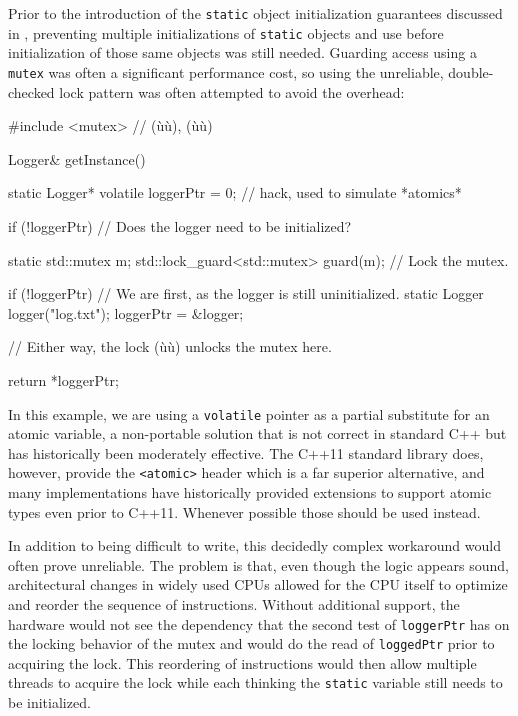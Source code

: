 Prior to the introduction of the  \lstinline!static!
object initialization guarantees discussed in , preventing multiple initializations of \lstinline!static! objects
and use before initialization of those same objects was still needed.
Guarding access using a \lstinline!mutex! was often a significant performance cost, so
using the unreliable, double-checked lock pattern was often attempted to
avoid the overhead:

\begin{emcppshiddenlisting}[emcppsbatch=e16]
#include <mutex>  // (ù{}ù), (ù{}ù)
\end{emcppshiddenlisting}
\begin{emcppslisting}[emcppsbatch=e16]
Logger& getInstance()
{
    static Logger* volatile loggerPtr = 0;  // hack, used to simulate *atomics*

    if (!loggerPtr)  // Does the logger need to be initialized?
    {
        static std::mutex m;
        std::lock_guard<std::mutex> guard(m);  // Lock the mutex.

        if (!loggerPtr)  // We are first, as the logger is still uninitialized.
        {
            static Logger logger("log.txt");
            loggerPtr = &logger;
        }
    }                    // Either way, the lock (ù{}ù) unlocks the mutex here.

    return *loggerPtr;
}
\end{emcppslisting}

\noindent In this example, we are using a \lstinline!volatile! pointer
as a partial
substitute for an atomic variable, a non-portable solution that is not correct
in standard C++ but has historically been moderately effective.  The C++11 standard
library does, however, provide the \lstinline!<atomic>! header which is a far superior alternative,
and many implementations have historically
provided extensions to support atomic types even prior to C++11.  Whenever possible those
should be used instead.

In addition to
being difficult to write, this decidedly complex workaround would often
prove unreliable. The problem is that, even though the logic appears
sound, architectural changes in widely used CPUs allowed for the CPU
itself to optimize and reorder the sequence of instructions. Without
additional support, the hardware would not see the dependency that the
second test of \lstinline!loggerPtr! has on the locking behavior of the
mutex and would do the read of \lstinline!loggedPtr! prior to acquiring the
lock. This reordering of instructions
would then allow multiple threads to acquire the lock while each thinking the
\lstinline!static! variable still needs to be initialized.


